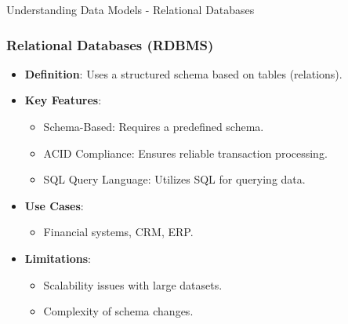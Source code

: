 \documentclass[aspectratio=169]{beamer}
\begin{document}
\begin{frame}[fragile]{Understanding Data Models - Relational Databases}
    \frametitle{Relational Databases (RDBMS)}
    
    \begin{itemize}
        \item \textbf{Definition}: Uses a structured schema based on tables (relations).
        \item \textbf{Key Features}:
            \begin{itemize}
                \item Schema-Based: Requires a predefined schema.
                \item ACID Compliance: Ensures reliable transaction processing.
                \item SQL Query Language: Utilizes SQL for querying data.
            \end{itemize}
        \item \textbf{Use Cases}:
            \begin{itemize}
                \item Financial systems, CRM, ERP.
            \end{itemize}
        \item \textbf{Limitations}:
            \begin{itemize}
                \item Scalability issues with large datasets.
                \item Complexity of schema changes.
            \end{itemize}
    \end{itemize}
\end{frame}
\end{document}
